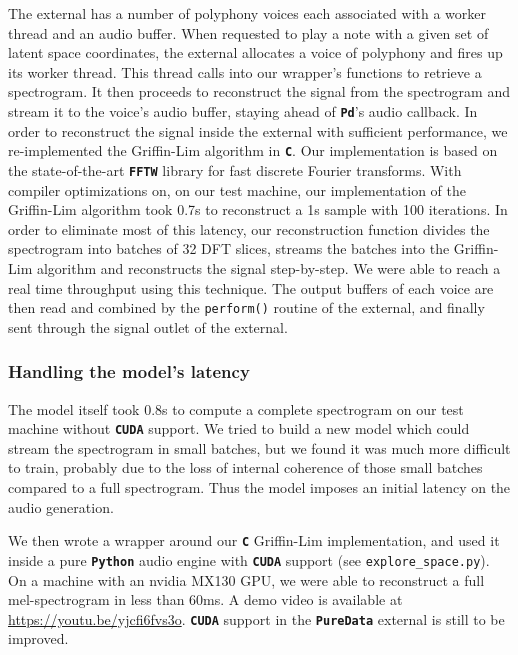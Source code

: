 \documentclass[11pt, english]{article}
\begin{document}
The external has a number of polyphony voices each associated with a worker thread and an audio buffer. When requested to play a note with a given set of latent space coordinates, the external allocates a voice of polyphony and fires up its worker thread. This thread calls into our wrapper's functions to retrieve a spectrogram. It then proceeds to reconstruct the signal from the spectrogram and stream it to the voice's audio buffer, staying ahead of \textbf{\texttt{Pd}}'s audio callback. \newline
In order to reconstruct the signal inside the external with sufficient performance, we re-implemented the Griffin-Lim algorithm in \textbf{\texttt{C}}. Our implementation is based on the state-of-the-art \textbf{\texttt{FFTW}} library for fast discrete Fourier transforms. With compiler optimizations on, on our test machine, our implementation of the Griffin-Lim algorithm took 0.7s to reconstruct a 1s sample with 100 iterations. In order to eliminate most of this latency, our reconstruction function divides the spectrogram into batches of 32 DFT slices, streams the batches into the Griffin-Lim algorithm and reconstructs the signal step-by-step. We were able to reach a real time throughput using this technique.\newline
The output buffers of each voice are then read and combined by the \texttt{perform()} routine of the external, and finally sent through the signal outlet of the external.

\subsubsection{Handling the model's latency}

The model itself took 0.8s to compute a complete spectrogram on our test machine without \textbf{\texttt{CUDA}} support. We tried to build a new model which could stream the spectrogram in small batches, but we found it was much more difficult to train, probably due to the loss of internal coherence of those small batches compared to a full spectrogram. Thus the model imposes an initial latency on the audio generation.  \newline

We then wrote a wrapper around our \textbf{\texttt{C}} Griffin-Lim implementation, and used it inside a pure \textbf{\texttt{Python}} audio engine with \textbf{\texttt{CUDA}} support (see \texttt{explore\_space.py}). On a machine with an nvidia MX130 GPU, we were able to reconstruct a full mel-spectrogram in less than 60ms. A demo video is available at \href{https://youtu.be/yjcfi6fvs3o}{https://youtu.be/yjcfi6fvs3o}. \textbf{\texttt{CUDA}} support in the \textbf{\texttt{PureData}} external is still to be improved. \vspace{1cm}
\end{document}
